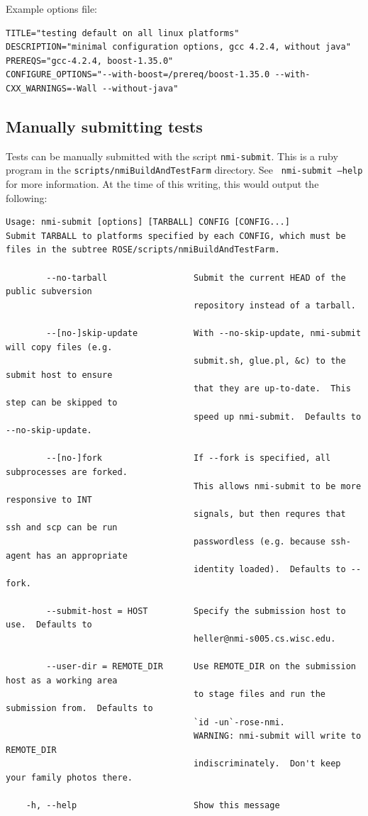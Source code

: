 Example options file:
\begin{verbatim}
TITLE="testing default on all linux platforms"
DESCRIPTION="minimal configuration options, gcc 4.2.4, without java"
PREREQS="gcc-4.2.4, boost-1.35.0"
CONFIGURE_OPTIONS="--with-boost=/prereq/boost-1.35.0 --with-CXX_WARNINGS=-Wall --without-java"
\end{verbatim}


\subsection{Manually submitting tests}%
\label{sec:nmi:submitting-tests}


Tests can be manually submitted with the script {\tt nmi-submit}.  This is a
ruby program in the {\tt scripts/nmiBuildAndTestFarm} directory.  See {\tt
nmi-submit --help} for more information.  At the time of this writing, this
would output the following:

\begin{verbatim}
Usage: nmi-submit [options] [TARBALL] CONFIG [CONFIG...]
Submit TARBALL to platforms specified by each CONFIG, which must be
files in the subtree ROSE/scripts/nmiBuildAndTestFarm.

        --no-tarball                 Submit the current HEAD of the public subversion
                                     repository instead of a tarball.

        --[no-]skip-update           With --no-skip-update, nmi-submit will copy files (e.g.
                                     submit.sh, glue.pl, &c) to the submit host to ensure
                                     that they are up-to-date.  This step can be skipped to
                                     speed up nmi-submit.  Defaults to --no-skip-update.

        --[no-]fork                  If --fork is specified, all subprocesses are forked.
                                     This allows nmi-submit to be more responsive to INT
                                     signals, but then requres that ssh and scp can be run
                                     passwordless (e.g. because ssh-agent has an appropriate
                                     identity loaded).  Defaults to --fork.

        --submit-host = HOST         Specify the submission host to use.  Defaults to
                                     heller@nmi-s005.cs.wisc.edu.

        --user-dir = REMOTE_DIR      Use REMOTE_DIR on the submission host as a working area
                                     to stage files and run the submission from.  Defaults to
                                     `id -un`-rose-nmi.
                                     WARNING: nmi-submit will write to REMOTE_DIR
                                     indiscriminately.  Don't keep your family photos there.

    -h, --help                       Show this message
\end{verbatim}

